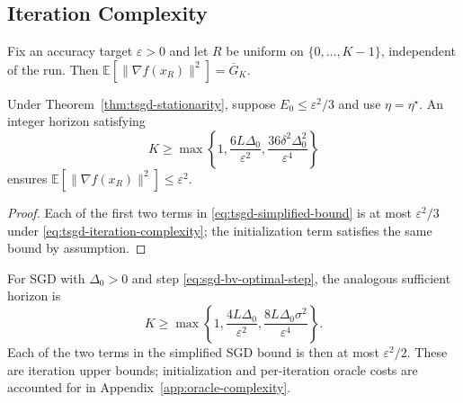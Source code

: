\subsection{Iteration Complexity}
\label{subsec:tsgd-complexity}

Fix an accuracy target $\varepsilon>0$ and let $R$ be uniform on
$\{0,\ldots,K-1\}$, independent of the run.
Then $\mathbb E[\|\nabla f(x_R)\|^2]=\overline G_K$.

\begin{corollary}
\label{cor:tsgd-iteration-complexity}
Under Theorem~\ref{thm:tsgd-stationarity}, suppose
$E_0\leq\varepsilon^2/3$ and use $\eta=\eta^\star$. An integer
horizon satisfying
\begin{equation}
\label{eq:tsgd-iteration-complexity}
K\geq\max\left\{1,\frac{6L\Delta_0}{\varepsilon^2},
                      \frac{36\delta^2\Delta_0^2}{\varepsilon^4}\right\}
\end{equation}
ensures $\mathbb E[\|\nabla f(x_R)\|^2]\leq\varepsilon^2$.
\end{corollary}
\begin{proof}
Each of the first two terms in \eqref{eq:tsgd-simplified-bound} is
at most $\varepsilon^2/3$ under \eqref{eq:tsgd-iteration-complexity};
the initialization term satisfies the same bound by assumption.
\end{proof}

For SGD with $\Delta_0>0$ and step \eqref{eq:sgd-bv-optimal-step},
the analogous sufficient horizon is
\begin{equation}
\label{eq:sgd-iteration-complexity}
K\geq\max\left\{1,\frac{4L\Delta_0}{\varepsilon^2},
                      \frac{8L\Delta_0\sigma^2}{\varepsilon^4}\right\}.
\end{equation}
Each of the two terms in the simplified SGD bound is then at most
$\varepsilon^2/2$. These are iteration upper bounds; initialization
and per-iteration oracle costs are accounted for in
Appendix~\ref{app:oracle-complexity}.
